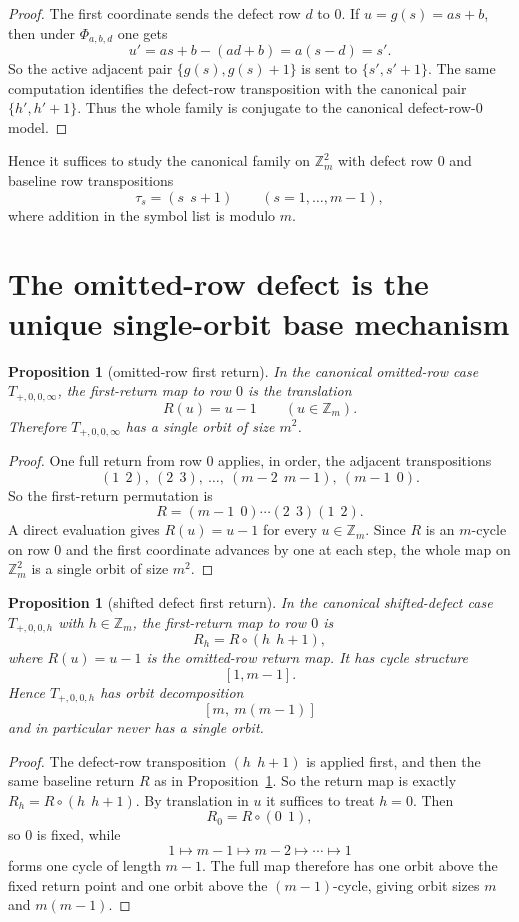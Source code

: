 \documentclass[11pt]{article}
\newtheorem{proposition}[theorem]{Proposition}
\begin{document}
\begin{proof}
The first coordinate sends the defect row $d$ to $0$.
If $u=g(s)=as+b$, then under $\Phi_{a,b,d}$ one gets
\[
 u' = as+b-(ad+b)=a(s-d)=s'.
\]
So the active adjacent pair $\{g(s),g(s)+1\}$ is sent to $\{s',s'+1\}$.
The same computation identifies the defect-row transposition with the canonical
pair $\{h',h'+1\}$.
Thus the whole family is conjugate to the canonical defect-row-$0$ model.
\end{proof}

Hence it suffices to study the canonical family on $\mathbb Z_m^2$ with defect
row $0$ and baseline row transpositions
\[
 \tau_s=(s\ \ s+1)\qquad (s=1,\dots,m-1),
\]
where addition in the symbol list is modulo $m$.

\section{The omitted-row defect is the unique single-orbit base mechanism}
\begin{proposition}[omitted-row first return]
\label{prop:omit-first-return}
In the canonical omitted-row case $T_{+,0,0,\infty}$, the first-return map to
row $0$ is the translation
\[
 R(u)=u-1\qquad (u\in\mathbb Z_m).
\]
Therefore $T_{+,0,0,\infty}$ has a single orbit of size $m^2$.
\end{proposition}

\begin{proof}
One full return from row $0$ applies, in order, the adjacent transpositions
\[
 (1\ \ 2),\ (2\ \ 3),\ \dots,\ (m-2\ \ m-1),\ (m-1\ \ 0).
\]
So the first-return permutation is
\[
 R=(m-1\ \ 0)\cdots(2\ \ 3)(1\ \ 2).
\]
A direct evaluation gives $R(u)=u-1$ for every $u\in\mathbb Z_m$.
Since $R$ is an $m$-cycle on row $0$ and the first coordinate advances by one at
each step, the whole map on $\mathbb Z_m^2$ is a single orbit of size $m^2$.
\end{proof}

\begin{proposition}[shifted defect first return]
\label{prop:shift-first-return}
In the canonical shifted-defect case $T_{+,0,0,h}$ with $h\in\mathbb Z_m$, the
first-return map to row $0$ is
\[
 R_h = R\circ(h\ \ h+1),
\]
where $R(u)=u-1$ is the omitted-row return map.
It has cycle structure
\[
 [1,m-1].
\]
Hence $T_{+,0,0,h}$ has orbit decomposition
\[
 [m,\ m(m-1)]
\]
and in particular never has a single orbit.
\end{proposition}

\begin{proof}
The defect-row transposition $(h\ \ h+1)$ is applied first, and then the same
baseline return $R$ as in Proposition~\ref{prop:omit-first-return}.
So the return map is exactly $R_h=R\circ(h\ \ h+1)$.
By translation in $u$ it suffices to treat $h=0$.
Then
\[
 R_0 = R\circ(0\ \ 1),
\]
so $0$ is fixed, while
\[
 1\mapsto m-1\mapsto m-2\mapsto\cdots\mapsto 1
\]
forms one cycle of length $m-1$.
The full map therefore has one orbit above the fixed return point and one orbit
above the $(m-1)$-cycle, giving orbit sizes $m$ and $m(m-1)$.
\end{proof}
\end{document}
